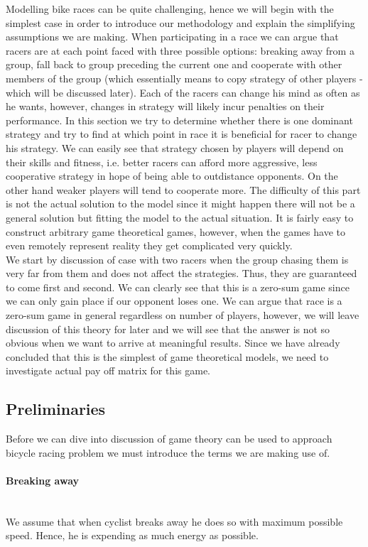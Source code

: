 \documentclass[10pt, a4paper]{report}
\begin{document}
Modelling bike races can be quite challenging, hence we will begin with the simplest case in order to introduce our methodology and explain the simplifying assumptions we are making. When participating in a race we can argue that racers are at each point faced with three possible options: breaking away from a group, fall back to group preceding the current one and cooperate with other members of the group (which essentially means to copy strategy of other players - which will be discussed later). Each of the racers can change his mind as often as he wants, however, changes in strategy will likely incur penalties on their performance. In this section we try to determine whether there is one dominant strategy and try to find at which point in race it is beneficial for racer to change his strategy. We can easily see that strategy chosen by players will depend on their skills and fitness, i.e. better racers can afford more aggressive, less cooperative strategy in hope of being able to outdistance opponents. On the other hand weaker players will tend to cooperate more. The difficulty of this part is not the actual solution to the model since it might happen there will not be a general solution but fitting the model to the actual situation. It is fairly easy to construct arbitrary game theoretical games, however, when the games have to even remotely represent reality they get complicated very quickly.\\

We start by discussion of case with two racers when the group chasing them is very far from them and does not affect the strategies. Thus, they are guaranteed to come first and second. We can clearly see that this is a zero-sum game since we can only gain place if our opponent loses one. We can argue that race is a zero-sum game in general regardless on number of players, however, we will leave discussion of this theory for later and we will see that the answer is not so obvious when we want to arrive at meaningful results. Since we have already concluded that this is the simplest of game theoretical models, we need to investigate actual pay off matrix for this game.

\subsection{Preliminaries}
Before we can dive into discussion of game theory can be used to approach bicycle racing problem we must introduce the terms we are making use of.

\paragraph{Breaking away} ~\\
We assume that when cyclist breaks away he does so with maximum possible speed. Hence, he is expending as much energy as possible.
\end{document}

